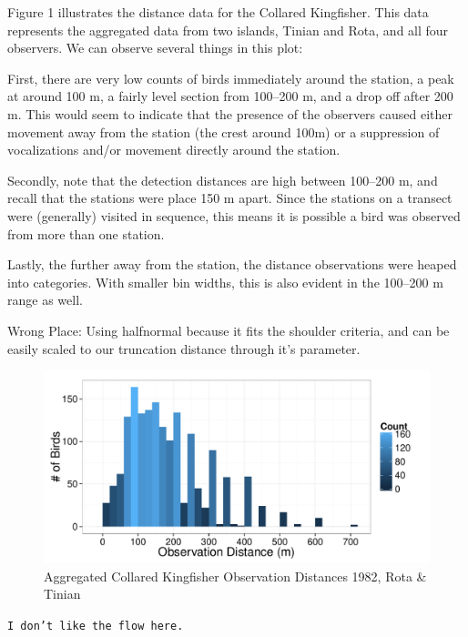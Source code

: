 \documentclass[12pt]{article}
\begin{document}
Figure 1 illustrates the distance data for the Collared Kingfisher. This data represents the aggregated data from two islands, Tinian and Rota, and all four observers. We can observe several things in this plot:

First, there are very low counts of birds immediately around the station, a peak at around 100 m, a fairly level section from 100--200 m, and a drop off after 200 m. This would seem to indicate that the presence of the observers caused either movement away from the station (the crest around 100m) or a suppression of vocalizations and/or movement directly around the station. 

Secondly, note that the detection distances are high between 100--200 m, and recall that the stations were place 150 m apart. Since the stations on a transect were (generally) visited in sequence, this means it is possible a bird was observed from more than one station. 

Lastly, the further away from the station, the distance observations were heaped into categories. With smaller bin widths, this is also evident in the 100--200 m range as well.


Wrong Place:  Using halfnormal because it fits the shoulder criteria, and can be easily scaled to our truncation distance through it's parameter.


\begin{figure}
\caption{Aggregated Collared Kingfisher Observation Distances 1982, Rota \& Tinian}
\includegraphics[width=\textwidth]{../images/histogram_distance.pdf}
\end{figure}

\texttt{I don't like the flow here.}
\end{document}

